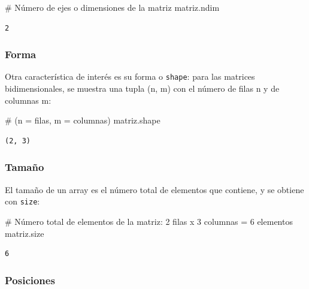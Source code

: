 \documentclass[
  letterpaper,
  DIV=11,
  numbers=noendperiod]{scrreprt}
\newenvironment{Shaded}{\begin{snugshade}}{\end{snugshade}}
\newcommand{\CommentTok}[1]{\textcolor[rgb]{0.37,0.37,0.37}{#1}}
\newcommand{\NormalTok}[1]{\textcolor[rgb]{0.00,0.23,0.31}{#1}}
\begin{document}
\begin{Shaded}
\begin{Highlighting}[]
\CommentTok{\# Número de ejes o dimensiones de la matriz}
\NormalTok{matriz.ndim}
\end{Highlighting}
\end{Shaded}

\begin{verbatim}
2
\end{verbatim}

\subsubsection{Forma}\label{forma}

Otra característica de interés es su forma o \texttt{shape}: para las
matrices bidimensionales, se muestra una tupla (n, m) con el número de
filas n y de columnas m:

\begin{Shaded}
\begin{Highlighting}[]
\CommentTok{\# (n = filas, m = columnas)}
\NormalTok{matriz.shape}
\end{Highlighting}
\end{Shaded}

\begin{verbatim}
(2, 3)
\end{verbatim}

\subsubsection{Tamaño}\label{tamauxf1o}

El tamaño de un array es el número total de elementos que contiene, y se
obtiene con \texttt{size}:

\begin{Shaded}
\begin{Highlighting}[]
\CommentTok{\# Número total de elementos de la matriz: 2 filas x 3 columnas = 6 elementos}
\NormalTok{matriz.size}
\end{Highlighting}
\end{Shaded}

\begin{verbatim}
6
\end{verbatim}

\subsubsection{Posiciones}\label{posiciones}
\end{document}
